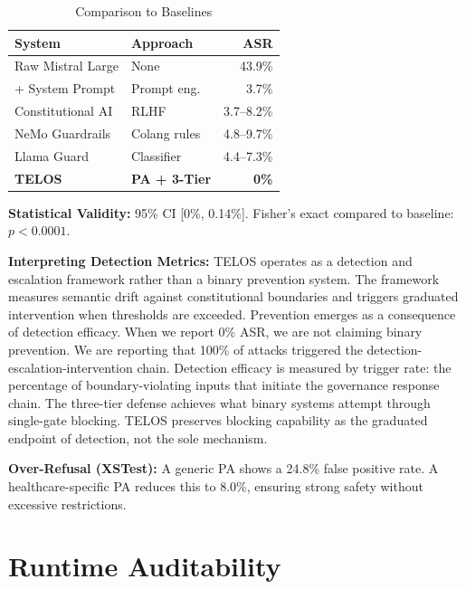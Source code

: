 \documentclass[11pt,twocolumn]{article}
\begin{document}
\begin{table}[t]
\centering
\small
\caption{Comparison to Baselines}
\begin{tabular}{@{}llr@{}}
\toprule
\textbf{System} & \textbf{Approach} & \textbf{ASR} \\
\midrule
Raw Mistral Large & None & 43.9\% \\
\quad + System Prompt & Prompt eng. & 3.7\% \\
Constitutional AI & RLHF & 3.7--8.2\% \\
NeMo Guardrails & Colang rules & 4.8--9.7\% \\
Llama Guard & Classifier & 4.4--7.3\% \\
\textbf{TELOS} & \textbf{PA + 3-Tier} & \textbf{0\%} \\
\bottomrule
\end{tabular}
\end{table}

\textbf{Statistical Validity:} 95\% CI [0\%, 0.14\%]. Fisher's exact compared to baseline: $p < 0.0001$.

\textbf{Interpreting Detection Metrics:} TELOS operates as a detection and escalation framework rather than a binary prevention system. The framework measures semantic drift against constitutional boundaries and triggers graduated intervention when thresholds are exceeded. Prevention emerges as a consequence of detection efficacy. When we report 0\% ASR, we are not claiming binary prevention. We are reporting that 100\% of attacks triggered the detection-escalation-intervention chain. Detection efficacy is measured by trigger rate: the percentage of boundary-violating inputs that initiate the governance response chain. The three-tier defense achieves what binary systems attempt through single-gate blocking. TELOS preserves blocking capability as the graduated endpoint of detection, not the sole mechanism.

\textbf{Over-Refusal (XSTest):} A generic PA shows a 24.8\% false positive rate. A healthcare-specific PA reduces this to 8.0\%, ensuring strong safety without excessive restrictions.

\section{Runtime Auditability}
\end{document}
